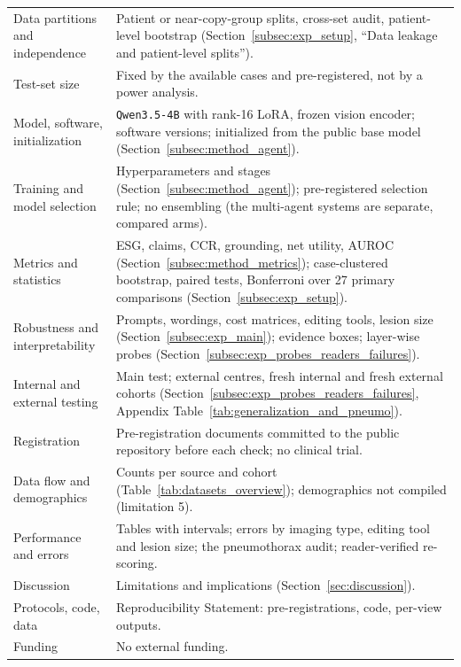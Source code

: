 \documentclass[5p,times,twocolumn,authoryear]{elsarticle}
\begin{document}
\begin{table}[!htbp]
\begin{center}
\begin{adjustbox}{max width=\linewidth}
\begin{tabular}{L{3.6cm}L{9.6cm}}
Data partitions and independence & Patient or near-copy-group splits, cross-set audit, patient-level bootstrap (Section~\ref{subsec:exp_setup}, ``Data leakage and patient-level splits''). \\
Test-set size & Fixed by the available cases and pre-registered, not by a power analysis. \\
Model, software, initialization & \texttt{Qwen3.5-4B} with rank-16 LoRA, frozen vision encoder; software versions; initialized from the public base model (Section~\ref{subsec:method_agent}). \\
Training and model selection & Hyperparameters and stages (Section~\ref{subsec:method_agent}); pre-registered selection rule; no ensembling (the multi-agent systems are separate, compared arms). \\
Metrics and statistics & ESG, claims, CCR, grounding, net utility, AUROC (Section~\ref{subsec:method_metrics}); case-clustered bootstrap, paired tests, Bonferroni over 27 primary comparisons (Section~\ref{subsec:exp_setup}). \\
Robustness and interpretability & Prompts, wordings, cost matrices, editing tools, lesion size (Section~\ref{subsec:exp_main}); evidence boxes; layer-wise probes (Section~\ref{subsec:exp_probes_readers_failures}). \\
Internal and external testing & Main test; external centres, fresh internal and fresh external cohorts (Section~\ref{subsec:exp_probes_readers_failures}, Appendix Table~\ref{tab:generalization_and_pneumo}). \\
Registration & Pre-registration documents committed to the public repository before each check; no clinical trial. \\
Data flow and demographics & Counts per source and cohort (Table~\ref{tab:datasets_overview}); demographics not compiled (limitation 5). \\
Performance and errors & Tables with intervals; errors by imaging type, editing tool and lesion size; the pneumothorax audit; reader-verified re-scoring. \\
Discussion & Limitations and implications (Section~\ref{sec:discussion}). \\
Protocols, code, data & Reproducibility Statement: pre-registrations, code, per-view outputs. \\
Funding & No external funding. \\
\bottomrule
\end{tabular}
\end{adjustbox}
\end{center}
\end{table}
\end{document}
